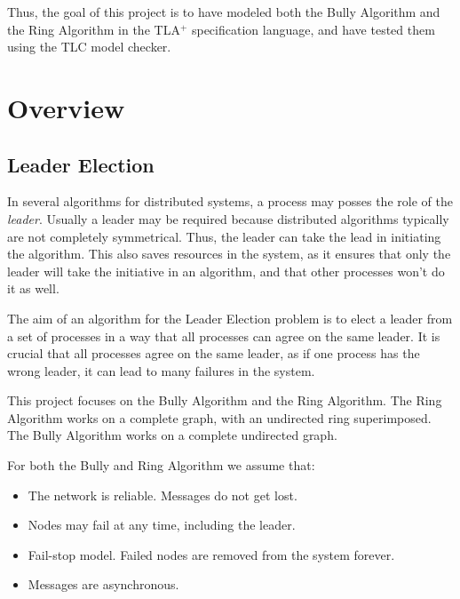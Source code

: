 \documentclass{report}
\begin{document}
Thus, the goal of this project is to have modeled both the Bully Algorithm and the Ring Algorithm in the TLA$^{+}$ specification language, and have tested them using the TLC model checker.

\chapter{Overview}

\section{Leader Election}

In several algorithms for distributed systems, a process may posses the role of the \textit{leader}. Usually a leader may be required because distributed algorithms typically are not completely symmetrical. Thus, the leader can take the lead in initiating the algorithm. This also saves resources in the system, as it ensures that only the leader will take the initiative in an algorithm, and that other processes won't do it as well.

The aim of an algorithm for the Leader Election problem is to elect a leader from a set of processes in a way that all processes can agree on the same leader. It is crucial that all processes agree on the same leader, as if one process has the wrong leader, it can lead to many failures in the system.


This project focuses on the Bully Algorithm and the Ring Algorithm. The Ring Algorithm works on a complete graph, with an undirected ring superimposed. The Bully Algorithm works on a complete undirected graph.

For both the Bully and Ring Algorithm we assume that:
\begin{itemize}
  \item The network is reliable. Messages do not get lost.
  \item Nodes may fail at any time, including the leader.
  \item Fail-stop model. Failed nodes are removed from the system forever.
  \item Messages are asynchronous.
\end{itemize}
\end{document}
